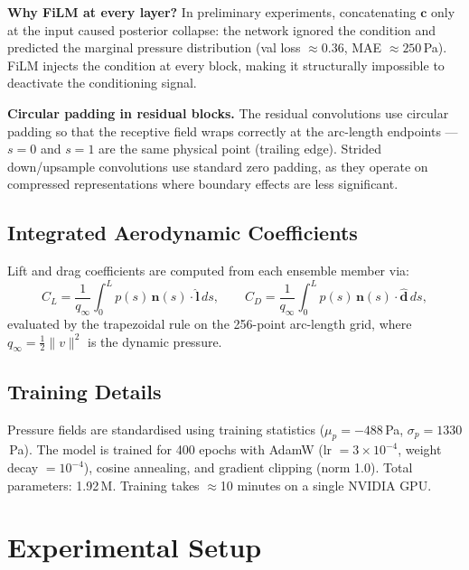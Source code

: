 \documentclass[12pt]{article}
\begin{document}
\textbf{Why FiLM at every layer?} In preliminary experiments, concatenating
$\mathbf{c}$ only at the input caused posterior collapse: the network ignored
the condition and predicted the marginal pressure distribution (val loss
$\approx 0.36$, MAE $\approx 250$\,Pa). FiLM injects the condition at every
block, making it structurally impossible to deactivate the conditioning signal.

\textbf{Circular padding in residual blocks.} The residual convolutions
use circular padding so that the receptive field wraps correctly at the
arc-length endpoints — $s=0$ and $s=1$ are the same physical point (trailing
edge). Strided down/upsample convolutions use standard zero padding, as they
operate on compressed representations where boundary effects are less significant.

\subsection{Integrated Aerodynamic Coefficients}

Lift and drag coefficients are computed from each ensemble member via:
\begin{equation}
    C_L = \frac{1}{q_\infty}\int_0^L p(s)\,\mathbf{n}(s)\cdot\hat{\mathbf{l}}\,ds, \qquad
    C_D = \frac{1}{q_\infty}\int_0^L p(s)\,\mathbf{n}(s)\cdot\hat{\mathbf{d}}\,ds,
\end{equation}
evaluated by the trapezoidal rule on the 256-point arc-length grid, where
$q_\infty = \tfrac{1}{2}\|v\|^2$ is the dynamic pressure.

\subsection{Training Details}

Pressure fields are standardised using training statistics
($\mu_p = -488$\,Pa, $\sigma_p = 1330$\,Pa). The model is trained for 400
epochs with AdamW (lr $= 3\times10^{-4}$, weight decay $= 10^{-4}$), cosine
annealing, and gradient clipping (norm 1.0). Total parameters: 1.92\,M.
Training takes $\approx$10 minutes on a single NVIDIA GPU.

\section{Experimental Setup}
\label{sec:experiments}
\end{document}
